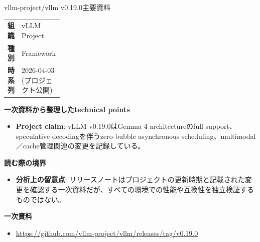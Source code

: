 \begin{technicalnote}{vllm-project/vllm v0.19.0}{主要資料}
\begingroup
\begin{tabularx}{\linewidth}{@{}>{\bfseries}p{0.22\linewidth}X@{}}
組織 & vLLM Project \\
種別 & Framework \\
時系列 & 2026-04-03 (プロジェクト公開) \\
\end{tabularx}
\smallskip
{\bfseries 一次資料から整理したtechnical points}
\begin{itemize}[leftmargin=1.5em,itemsep=0.35em]
\item \textbf{Project claim}: vLLM v0.19.0はGemma 4 architectureのfull support、speculative decodingを伴うzero-bubble asynchronous scheduling、multimodal／cache管理関連の変更を記録している。
\end{itemize}
\begin{minipage}{\linewidth}
{\bfseries 読む際の境界}
\begin{itemize}[leftmargin=1.5em,itemsep=0.35em]
\item \textbf{分析上の留意点}: リリースノートはプロジェクトの更新時期と記載された変更を確認する一次資料だが、すべての環境での性能や互換性を独立検証するものではない。
\end{itemize}
\begin{samepage}
{\bfseries 一次資料}
\begingroup\sloppy
\begin{itemize}[leftmargin=1.5em,itemsep=0.25em]
\item {\scriptsize\url{https://github.com/vllm-project/vllm/releases/tag/v0.19.0}}
\end{itemize}
\endgroup
\end{samepage}
\end{minipage}
\endgroup
\end{technicalnote}
\medskip

